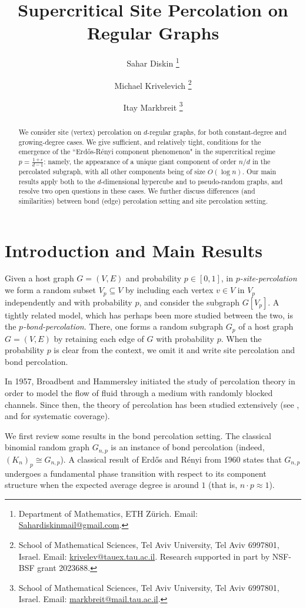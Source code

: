 \documentclass[notitlepage]{scrartcl}
\title{\vspace{-1.5cm}Supercritical Site Percolation on Regular Graphs}
\author{Sahar Diskin \footnote{Department of Mathematics, ETH Z\"urich. Email: \href{mailto:Sahardiskinmail@gmail.com}{Sahardiskinmail@gmail.com}.} \and 
Michael Krivelevich \footnote{School of Mathematical Sciences, Tel Aviv University, Tel Aviv 6997801, Israel. \newline Email:
\href{mailto:krivelev@tauex.tau.ac.il}{krivelev@tauex.tau.ac.il}. Research supported in part by NSF-BSF grant 2023688.} \and 
Itay Markbreit \footnote{School of Mathematical Sciences, Tel Aviv University, Tel Aviv 6997801, Israel. \newline Email:
\href{mailto:markbreit@mail.tau.ac.il}{markbreit@mail.tau.ac.il}.}}
\begin{document}
\date{}
\maketitle

\begin{abstract}
    We consider site (vertex) percolation on $d$-regular graphs, for both constant-degree and growing-degree cases. We give sufficient, and relatively tight, conditions for the emergence of the ``Erd\H os-R\'enyi component phenomenon" in the supercritical regime $p=\frac{1+\epsilon}{d-1}$: namely, the appearance of a unique giant component of order $n/d$ in the percolated subgraph, with all other components being of size $O(\log n)$. Our main results apply both to the $d$-dimensional hypercube and to pseudo-random graphs, and resolve two open questions in these cases. We further discuss differences (and similarities) between bond (edge) percolation setting and site percolation setting.
\end{abstract}

\section{Introduction and Main Results}\label{intro}

Given a host graph $G=(V,E)$ and probability $p\in [0,1]$, in \textit{$p$-site-percolation} we form a random subset $V_p \subseteq V$ by including each vertex $v \in V$ in $V_p$ independently and with probability $p$, and consider the subgraph $G[V_p]$.
A tightly related model, which has perhaps been more studied between the two, is the \textit{$p$-bond-percolation}. There, one forms a random subgraph $G_p$ of a host graph $G=(V,E)$ by retaining each edge of $G$ with probability $p$. When the probability $p$ is clear from the context, we omit it and write site percolation and bond percolation.

In 1957, Broadbent and Hammersley \cite{zbMATH03148802} initiated the study of percolation theory in order to model the flow of fluid through a medium with randomly blocked channels. Since then, the theory of percolation has been studied extensively (see \cite{zbMATH05076923}, \cite{zbMATH01301486} and \cite{zbMATH03826957} for systematic coverage).

We first review some results in the bond percolation setting. The classical binomial random graph $G_{n,p}$ is an instance of bond percolation (indeed, $(K_n)_p\cong G_{n,p}$). A classical result of Erd\H os and R\'enyi from 1960 \cite{zbMATH03168330} states that $G_{n,p}$ undergoes a fundamental phase transition with respect to its component structure when the expected average degree is around $1$ (that is, $n\cdot p \approx 1$).
\end{document}
